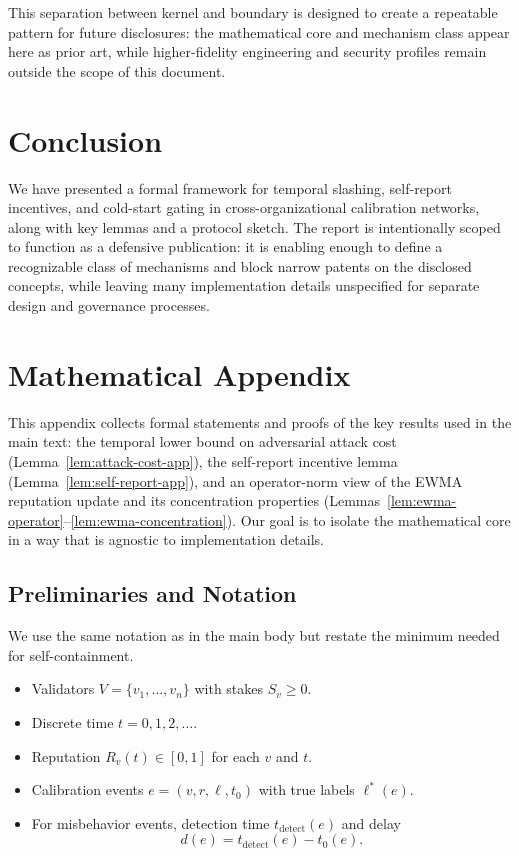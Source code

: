 \documentclass[11pt]{article}
\theoremstyle{plain}
\theoremstyle{definition}
\begin{document}
This separation between kernel and boundary is designed to create a repeatable pattern for future disclosures: the mathematical core and mechanism class appear here as prior art, while higher-fidelity engineering and security profiles remain outside the scope of this document.

\section{Conclusion}

We have presented a formal framework for temporal slashing, self-report incentives, and cold-start gating in cross-organizational calibration networks, along with key lemmas and a protocol sketch. The report is intentionally scoped to function as a defensive publication: it is enabling enough to define a recognizable class of mechanisms and block narrow patents on the disclosed concepts, while leaving many implementation details unspecified for separate design and governance processes.
\appendix
\section{Mathematical Appendix}
\label{app:math}

This appendix collects formal statements and proofs of the key results used in the main text: the temporal lower bound on adversarial attack cost (Lemma~\ref{lem:attack-cost-app}), the self-report incentive lemma (Lemma~\ref{lem:self-report-app}), and an operator-norm view of the EWMA reputation update and its concentration properties (Lemmas~\ref{lem:ewma-operator}--\ref{lem:ewma-concentration}). Our goal is to isolate the mathematical core in a way that is agnostic to implementation details.

\subsection{Preliminaries and Notation}

We use the same notation as in the main body but restate the minimum needed for self-containment.

\begin{itemize}[leftmargin=*]
  \item Validators \(V = \{v_1,\dots,v_n\}\) with stakes \(S_v \ge 0\).
  \item Discrete time \(t = 0,1,2,\dots\).
  \item Reputation \(R_v(t) \in [0,1]\) for each \(v\) and \(t\).
  \item Calibration events \(e = (v, r, \ell, t_0)\) with true labels \(\ell^*(e)\).
  \item For misbehavior events, detection time \(t_{\mathrm{detect}}(e)\) and delay
  \[
  d(e) = t_{\mathrm{detect}}(e) - t_0(e).
  \]
\end{itemize}
\end{document}
